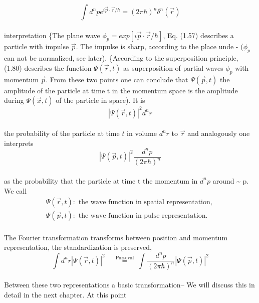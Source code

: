 \begin{equation}
\int d^{n} p e^{i \vec{p} \cdot \vec{r} / \hbar}=(2 \pi \hbar)^{n} \delta^{n}(\vec{r})
\end{equation}\\
interpretation
\{The plane wave $\phi_p=exp[i\vec{p}\cdot\vec{r}/\hbar]$, Eq. (1.57) describes a particle
with impulse $\vec{p}$. The impulse is sharp, according to the place unde -
($\phi_p$ can not be normalized, see later).
\{According to the superposition principle, (1.80) describes the function $\Psi(\vec{r},t)$
as superposition of partial waves $\phi_p$ with momentum $\vec{p}$.
From these two points one can conclude that $\Psi(\vec{p},t)$ the amplitude
of the particle at time t in the momentum space is the amplitude during $\Psi(\vec{x},t)$
of the particle in space).
It is
\\
\begin{equation}
|\Psi(\vec{r}, t)|^{2} d^{n} r
\end{equation}\\
the probability of the particle at time $t$ in volume $d^nr$ to $\vec{r}$
and analogously one interprets
\\
\begin{equation}
|\Psi(\vec{p}, t)|^{2} \frac{d^{n} p}{(2 \pi \hbar)^{n}}
\end{equation}\\
as the probability that the particle at time t the momentum in $d^np$
around \~{} p. We call
\\
\begin{equation}
\begin{array}{l}{\Psi(\vec{r}, t): \text { the wave function in spatial representation, }} \\ {\Psi(\vec{p}, t): \text { the wave function in pulse representation. }}\end{array}
\end{equation}\\
The Fourier transformation transforms between position and momentum representation,
the standardization is preserved,
\\
\begin{equation}
\int d^{n} r|\Psi(\vec{r}, t)|^{2} \quad \stackrel{\text { Parseval }}{=} \int \frac{d^{n} p}{(2 \pi \hbar)^{n}}|\Psi(\vec{p}, t)|^{2}
\end{equation}\\
Between these two representations a basic transformation--
We will discuss this in detail in the next chapter. At this point
